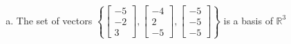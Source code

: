 \begin{exerciseAnswer}
\begin{enumerate}[(a)]
\item The set of vectors \( \left\{ \left[\begin{array}{c}
-5 \\
-2 \\
3
\end{array}\right] , \left[\begin{array}{c}
-4 \\
2 \\
-5
\end{array}\right] , \left[\begin{array}{c}
-5 \\
-5 \\
-5
\end{array}\right] \right\} \) is a basis of \(\mathbb{R}^3\)
\end{enumerate}
    
\end{exerciseAnswer}
    
